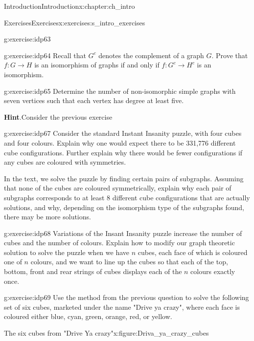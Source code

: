 \documentclass[oneside,10pt,]{book}
\newcommand{\blocktitlefont}{\relax}
\numberwithin{equation}{section}
\begin{document}
\begin{chapterptx}{Introduction}{}{Introduction}{}{}{x:chapter:ch_intro}
\begin{exercises-section}{Exercises}{}{Exercises}{}{}{x:exercises:s_intro_exercises}
\begin{divisionexercise}{5}{}{}{g:exercise:idp63}
\end{divisionexercise}%
\begin{divisionexercise}{6}{}{}{g:exercise:idp64}%
Recall that \(G^c\) denotes the complement of a graph \(G\).  Prove that \(f:G\to H\) is an isomorphism of graphs if and only if \(f:G^c\to H^c\) is an isomorphism.%
\end{divisionexercise}%
\begin{divisionexercise}{7}{}{}{g:exercise:idp65}%
Determine the number of non-isomorphic simple graphs with seven vertices such that each vertex has degree at least five.%
\par\smallskip%
\noindent\textbf{\blocktitlefont Hint}.\hypertarget{g:hint:idp66}{}\quad{}Consider the previous exercise%
\end{divisionexercise}%
\begin{divisionexercise}{8}{}{}{g:exercise:idp67}%
Consider the standard Instant Insanity puzzle, with four cubes and four colours.  Explain why one would expect there to be 331,776 different cube configurations.  Further explain why there would be fewer configurations if any cubes are coloured with symmetries.%
\par
In the text, we solve the puzzle by finding certain pairs of subgraphs.  Assuming that none of the cubes are coloured symmetrically, explain why each pair of subgraphs corresponds to at least 8 different cube configurations that are actually solutions, and why, depending on the isomorphism type of the subgraphs found, there may be more solutions.%
\end{divisionexercise}%
\begin{divisionexercise}{9}{}{}{g:exercise:idp68}%
Variations of the Insant Insanity puzzle increase the number of cubes and the number of colours.  Explain how to modify our graph theoretic solution to solve the puzzle when we have \(n\) cubes, each face of which is coloured one of \(n\) colours, and we want to line up the cubes so that each of the top, bottom, front and rear strings of cubes displays each of the \(n\) colours exactly once.%
\end{divisionexercise}%
\begin{divisionexercise}{10}{}{}{g:exercise:idp69}%
Use the method from the previous question to solve the following set of six cubes, marketed under the name "Drive ya crazy", where each face is coloured either blue, cyan, green, orange, red, or yellow.%
\begin{figureptx}{The six cubes from "Drive Ya crazy"}{x:figure:Driva_ya_crazy_cubes}{}%

\end{figureptx}
\end{divisionexercise}
\end{exercises-section}
\end{chapterptx}
\end{document}
